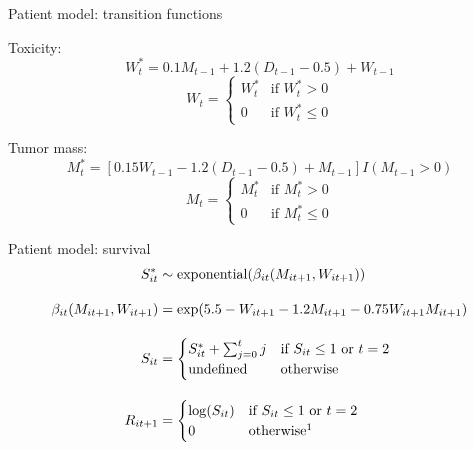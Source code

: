 \documentclass[handout]{beamer}
\begin{document}
\begin{frame}[c]{Patient model: transition functions}
  
  Toxicity:
  \begin{equation*}
  W^{*}_{t} = 0.1 M_{t-1} + 1.2 (D_{t-1} - 0.5) + W_{t - 1}
  \end{equation*}
  \begin{equation*}
  W_{t} = \begin{cases}
    W^{*}_{t} &\text{if } W^{*}_{t} > 0 \\
    0 &\text{if } W^{*}_{t} \leq 0
  \end{cases}
  \end{equation*}
  
  Tumor mass:
  \begin{equation*}
  M^{*}_{t} = [0.15 W_{t-1} - 1.2 (D_{t-1} - 0.5) + M_{t - 1}] I(M_{t-1} > 0)
  \end{equation*}
  \begin{equation*}
  M_{t} = \begin{cases}
    M^{*}_{t} &\text{if } M^{*}_{t} > 0 \\
    0 &\text{if } M^{*}_{t} \leq 0
  \end{cases}
  \end{equation*}
  
\end{frame}

\begin{frame}[c]{Patient model: survival}
  \begin{align*}
    S^{*}_{it} &\sim \operatorname{exponential}(\beta_{it}(M_{it + 1}, W_{it + 1})) \\[1em]
    \beta_{it}(M_{it+1}, W_{it+1}) &= \exp(5.5 - W_{it+1} - 1.2 M_{it+1} - 0.75 W_{it+1} M_{it+1}) \\[1em]
    S_{it} &= \begin{cases}
      S^{*}_{it} + \sum_{j = 0}^{t} j & \text{if } S_{it} \leq 1 \text{ or } t = 2 \\
      \text{undefined} & \text{otherwise}
    \end{cases} \\[1em]
    R_{it + 1} &=\begin{cases}
          \log(S_{it}) & \text{if } S_{it} \leq 1 \text{ or } t = 2 \\
          0 & \text{otherwise\footnotemark}
        \end{cases}
  \end{align*}  
\end{frame}
\end{document}
